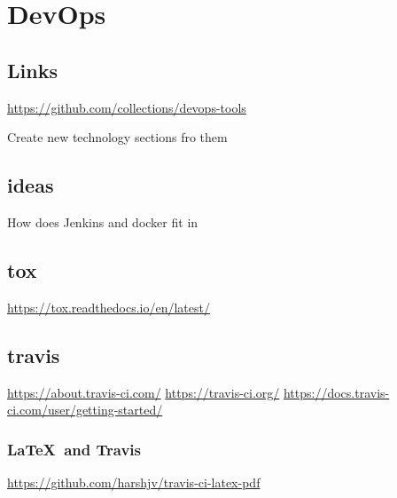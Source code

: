 \chapter{DevOps}

\section{Links}

\url{https://github.com/collections/devops-tools}

Create new technology sections fro them

\section{ideas}

\begin{exercise}
How does Jenkins and docker fit in 
\end{exercise}

\section{tox}

\url{https://tox.readthedocs.io/en/latest/}

\section{travis}

\url{https://about.travis-ci.com/}
\url{https://travis-ci.org/}
\url{https://docs.travis-ci.com/user/getting-started/}


\subsection{\LaTeX~and Travis}

\url{https://github.com/harshjv/travis-ci-latex-pdf}
